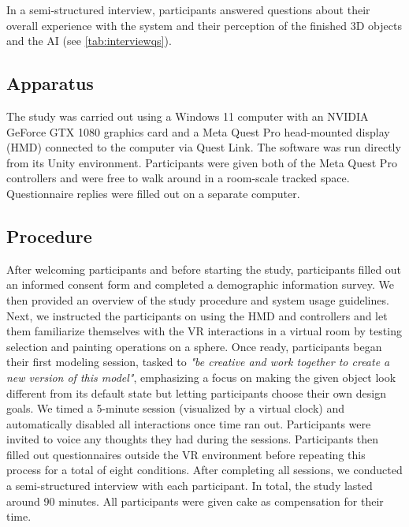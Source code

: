  In a semi-structured interview, participants answered questions about their overall experience with the system and their perception of the finished 3D objects and the AI (see \autoref{tab:interviewqs}).




\subsection{Apparatus}
The study was carried out using a Windows 11 computer with an NVIDIA GeForce GTX 1080 graphics card and a Meta Quest Pro head-mounted display (HMD) connected to the computer via Quest Link. The software was run directly from its Unity environment. Participants were given both of the Meta Quest Pro controllers and were free to walk around in a room-scale tracked space. Questionnaire replies were filled out on a separate computer.



\subsection{Procedure}
After welcoming participants and before starting the study, participants filled out an informed consent form and completed a demographic information survey. We then provided an overview of the study procedure and system usage guidelines.
Next, we instructed the participants on using the HMD and controllers and let them familiarize themselves with the VR interactions in a virtual room by testing selection and painting operations on a sphere. 
Once ready, participants began their first modeling session, tasked to \textit{"be creative and work together to create a new version of this model"}, emphasizing a focus on making the given object look different from its default state but letting participants choose their own design goals.
We timed a 5-minute session (visualized by a virtual clock) and automatically disabled all interactions once time ran out. 
Participants were invited to voice any thoughts they had during the sessions.
Participants then filled out questionnaires outside the VR environment before repeating this process for a total of eight conditions. After completing all sessions, we conducted a semi-structured interview with each participant. 
In total, the study lasted around 90 minutes. All participants were given cake as compensation for their time.





